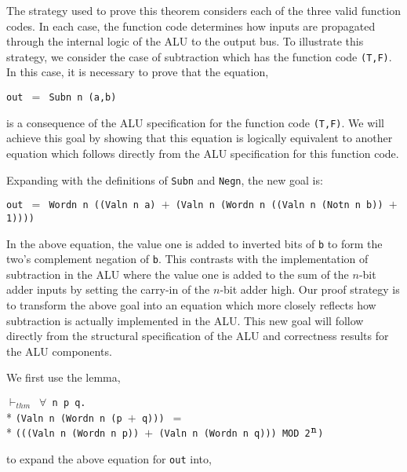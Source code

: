 \begin{normalsize}
The strategy used to prove this theorem considers each of the three valid
function codes.  In each case, the function code determines
how inputs are propagated through the internal logic of the ALU
to the output bus.
To illustrate this strategy, we consider the case of subtraction
which has the function code \verb"(T,F)".
In this case, it is necessary to prove that the equation,

\hspace*{\fill}
\verb"out "$=$\verb" Subn n (a,b)"
\hspace*{\fill}

is a consequence of the ALU specification for the function code \verb"(T,F)".
We will achieve this goal by showing that this equation is logically
equivalent to another equation which follows directly from the ALU
specification for this function code.

Expanding with the definitions of \verb"Subn" and \verb"Negn",
the new goal is:

\hspace*{\fill}
\verb"out "$=$\verb" Wordn n ((Valn n a) "$+$\verb" (Valn n (Wordn n ((Valn n (Notn n b)) "$+$\verb" 1))))"
\hspace*{\fill}

In the above equation, the value one is added to inverted bits of \verb"b"
to form the two's complement negation of \verb"b".
This contrasts with the implementation of subtraction in the ALU
where the value one is added to the sum of the \mbox{$n$-bit} adder
inputs by setting the carry-in of the
\mbox{$n$-bit} adder high.
Our proof strategy is to transform the above goal into an
equation which more closely reflects how subtraction is
actually implemented in the ALU.
This new goal will follow directly from the structural specification
of the ALU and correctness results for the ALU components.

We first use the lemma,

\begin{minipage}{17cm}
$\vdash_{thm}$\verb" "$\forall$\verb" n p q."\\*
\verb"(Valn n (Wordn n (p "$+$\verb" q))) "$=$\\*
\verb"(((Valn n (Wordn n p)) "$+$\verb" (Valn n (Wordn n q))) MOD 2"$^{\verb"n"}$\verb")"
\end{minipage}

to expand the above equation for \verb"out" into,


\end{normalsize}
